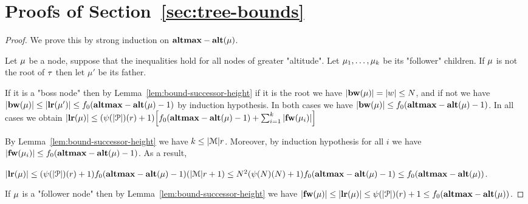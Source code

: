 \section{Proofs of Section~\ref{sec:tree-bounds}}

\lemBoundLengthHeightH*

\begin{proof}
	We prove this by strong induction on $\mathbf{altmax}-\mathbf{alt}(\mu)$.
	
	Let $\mu$ be a node, suppose that the inequalities hold for all nodes of greater "altitude". 
	Let $\mu_1, \ldots, \mu_k$ be its "follower" children. If $\mu$ is not the root of $\tau$ then let $\mu'$ be its father.
	
	If it is a "boss node" then by Lemma~\ref{lem:bound-successor-height} if it is the root we have $|\mathbf{bw}(\mu)| = |w| \leq N$, and if not we have $|\mathbf{bw}(\mu)| \leq |\mathbf{lr}(\mu')| \leq f_0(\mathbf{altmax} - \mathbf{alt}(\mu) -1)$ by induction hypothesis. In both cases we have $|\mathbf{bw}(\mu)| \leq f_0(\mathbf{altmax} - \mathbf{alt}(\mu) -1)$.	
	In all cases we obtain $|\mathbf{lr}(\mu)| \leq (\psi(|\mathcal{P}|)(r)+1) \Big[f_0(\mathbf{altmax}-\mathbf{alt}(\mu) -1) + \sum_{i=1}^k |\mathbf{fw}(\mu_i)|\Big]$
	
	By Lemma~\ref{lem:bound-successor-height} we have $k \leq |\mathcal{M}|r$.
	Moreover, by induction hypothesis for all $i$ we have 
	$|\mathbf{fw}(\mu_i)| \leq f_0(\mathbf{altmax}-\mathbf{alt}(\mu) -1)$. As a result,
	
	$|\mathbf{lr}(\mu)| \leq (\psi(|\mathcal{P}|)(r)+1) f_0(\mathbf{altmax}-\mathbf{alt}(\mu) -1)(|\mathcal{M}| r +1) \leq N^2(\psi(N)(N) +1) f_0(\mathbf{altmax} - \mathbf{alt}(\mu) -1) \leq f_0(\mathbf{altmax} - \mathbf{alt}(\mu))$.
	
	If $\mu$ is a "follower node" then by Lemma~\ref{lem:bound-successor-height} we have 
	$|\mathbf{fw}(\mu)| \leq |\mathbf{lr}(\mu)| \leq \psi(|\mathcal{P}|)(r) +1 \leq f_0(\mathbf{altmax} - \mathbf{alt}(\mu))$.
\end{proof}

\lemBoundMaxHeight*

